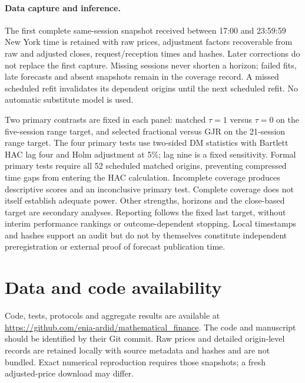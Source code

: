 \documentclass[12pt,a4paper]{article}
\begin{document}
\paragraph{Data capture and inference.}
The first complete same-session snapshot received between 17:00 and 23:59:59
New York time is retained with raw prices, adjustment factors recoverable from
raw and adjusted closes, request/reception times and hashes. Later corrections
do not replace the first capture. Missing sessions never shorten a horizon;
failed fits, late forecasts and absent snapshots remain in the coverage record.
A missed scheduled refit invalidates its dependent origins until the next
scheduled refit. No automatic substitute model is used.

Two primary contrasts are fixed in each panel: matched $\tau=1$ versus
$\tau=0$ on the five-session range target, and selected fractional versus
GJR on the 21-session range target. The four primary tests use two-sided
DM statistics with Bartlett HAC lag four and Holm adjustment at 5\%; lag
nine is a fixed sensitivity. Formal primary tests require all 52 scheduled
matched origins, preventing compressed time gaps from entering the HAC
calculation. Incomplete coverage produces descriptive scores and an
inconclusive primary test. Complete coverage does not itself establish
adequate power. Other strengths, horizons and the close-based target are
secondary analyses. Reporting follows the fixed last target, without interim
performance rankings or outcome-dependent stopping. Local timestamps and
hashes support an audit but do not by themselves constitute independent
preregistration or external proof of forecast publication time.

\section*{Data and code availability}
Code, tests, protocols and aggregate results are available at
\url{https://github.com/enia-ardid/mathematical_finance}.
The code and manuscript should be identified by their Git commit.
Raw prices and detailed origin-level records are retained locally with source
metadata and hashes and are not bundled. Exact numerical reproduction
requires those snapshots; a fresh adjusted-price download may differ.





\end{document}
